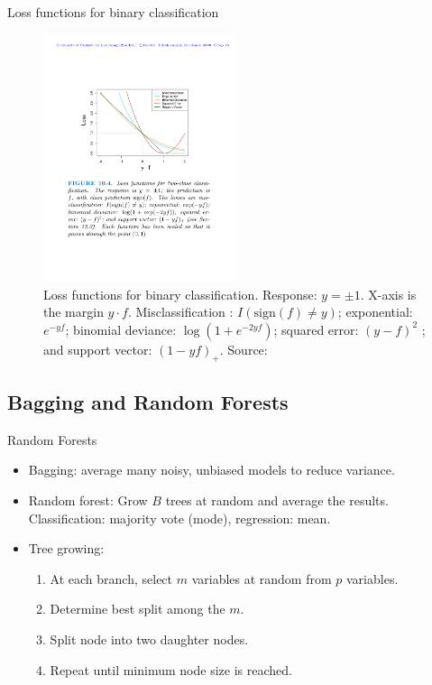 \documentclass{beamer}
\begin{document}
\begin{frame}{Loss functions for binary classification}
\begin{figure}
    \centering
    \includegraphics[width=0.5\textwidth]{figures/lossfunctions.pdf}
    \caption{Loss functions for binary classification. Response: $y = \pm1$. X-axis is the margin $y \cdot f$. Misclassification : $I(\mathrm{sign}(f) \neq y)$; exponential: $e^{-yf}$; binomial deviance: $\log(1 + e^{-2yf})$; squared error: $(y - f)^2$ ; and support vector: $(1 - yf)_+$. Source: \cite{hastieElementsStatisticalLearning2016}}
\end{figure}
\end{frame}


\subsection{Bagging and Random Forests}

\begin{frame}{Random Forests}
    \begin{itemize}
        \item Bagging: average many noisy, unbiased models to reduce variance.
        \item Random forest: Grow $B$ trees at random and average the results. Classification: majority vote (mode), regression: mean.
        \item Tree growing:
        \begin{enumerate}
            \item At each branch, select $m$ variables at random from $p$ variables.
            \item Determine best split among the $m$.
            \item Split node into two daughter nodes.
            \item Repeat until minimum node size is reached.
        \end{enumerate}
        
    \end{itemize}
\end{frame}
\end{document}
